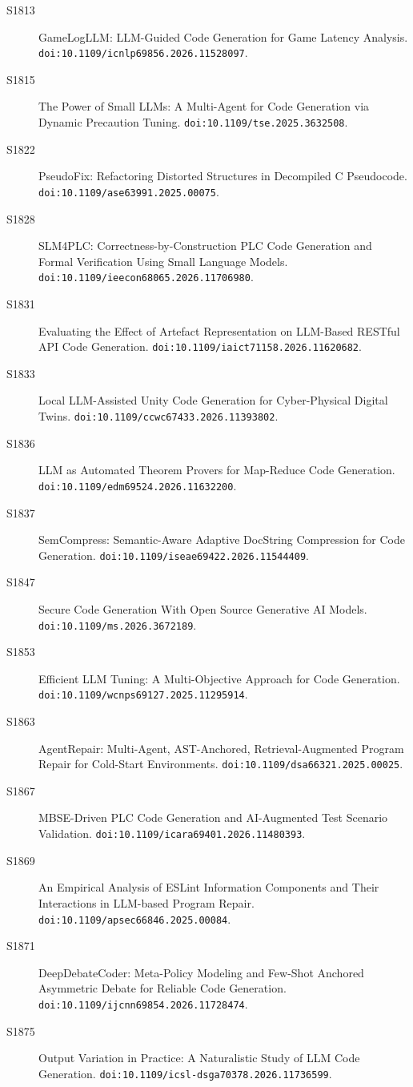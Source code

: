 {\begin{description}
\item[S1813] GameLogLLM: LLM-Guided Code Generation for Game Latency Analysis. \texttt{doi:10.1109/icnlp69856.2026.11528097}.
\item[S1815] The Power of Small LLMs: A Multi-Agent for Code Generation via Dynamic Precaution Tuning. \texttt{doi:10.1109/tse.2025.3632508}.
\item[S1822] PseudoFix: Refactoring Distorted Structures in Decompiled C Pseudocode. \texttt{doi:10.1109/ase63991.2025.00075}.
\item[S1828] SLM4PLC: Correctness-by-Construction PLC Code Generation and Formal Verification Using Small Language Models. \texttt{doi:10.1109/ieecon68065.2026.11706980}.
\item[S1831] Evaluating the Effect of Artefact Representation on LLM-Based RESTful API Code Generation. \texttt{doi:10.1109/iaict71158.2026.11620682}.
\item[S1833] Local LLM-Assisted Unity Code Generation for Cyber-Physical Digital Twins. \texttt{doi:10.1109/ccwc67433.2026.11393802}.
\item[S1836] LLM as Automated Theorem Provers for Map-Reduce Code Generation. \texttt{doi:10.1109/edm69524.2026.11632200}.
\item[S1837] SemCompress: Semantic-Aware Adaptive DocString Compression for Code Generation. \texttt{doi:10.1109/iseae69422.2026.11544409}.
\item[S1847] Secure Code Generation With Open Source Generative AI Models. \texttt{doi:10.1109/ms.2026.3672189}.
\item[S1853] Efficient LLM Tuning: A Multi-Objective Approach for Code Generation. \texttt{doi:10.1109/wcnps69127.2025.11295914}.
\item[S1863] AgentRepair: Multi-Agent, AST-Anchored, Retrieval-Augmented Program Repair for Cold-Start Environments. \texttt{doi:10.1109/dsa66321.2025.00025}.
\item[S1867] MBSE-Driven PLC Code Generation and AI-Augmented Test Scenario Validation. \texttt{doi:10.1109/icara69401.2026.11480393}.
\item[S1869] An Empirical Analysis of ESLint Information Components and Their Interactions in LLM-based Program Repair. \texttt{doi:10.1109/apsec66846.2025.00084}.
\item[S1871] DeepDebateCoder: Meta-Policy Modeling and Few-Shot Anchored Asymmetric Debate for Reliable Code Generation. \texttt{doi:10.1109/ijcnn69854.2026.11728474}.
\item[S1875] Output Variation in Practice: A Naturalistic Study of LLM Code Generation. \texttt{doi:10.1109/icsl-dsga70378.2026.11736599}.

\end{description}}
